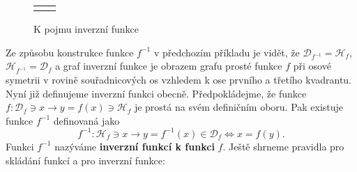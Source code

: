 {       \begin{figure}[ht!]
         \centering  
         \begin{tabular}{cc}
           \subfloat[ ]{\label{mai_fig016a}
             }              &
           \subfloat[ ]{\label{mai_fig016b}
             }              \\
         \end{tabular}
         \caption{K pojmu inverzní funkce}
         \label{mai_fig016}
       \end{figure}
      
        
      
      Ze způsobu konstrukce funkce \(f^{-1}\) v předchozím příkladu je vidět, že 
      \(\mathcal{D}_{f^{-1}} = \mathcal{H}_f\), \(\mathcal{H}_{f^{-1}} = \mathcal{D}_f\) a graf 
      inverzní funkce je obrazem grafu prosté funkce \(f\) při osové symetrii v rovině 
      souřadnicových os vzhledem k ose prvního a třetího kvadrantu. Nyní již definujeme inverzní 
      funkci obecně. Předpokládejme, že funkce \(f : \mathcal{D}_f\ni x \rightarrow y = f(x)\ni 
      \mathcal{H}_f\) je prostá na svém definičním oboru. Pak existuje funkce \(f^{-1}\) definovaná 
      jako
      \begin{equation}\label{mai:eq029}
        f^{-1} :\mathcal{H}_f\ni x\rightarrow y = f^{-1}(x)\in\mathcal{D}_f\Leftrightarrow x = f(y).
      \end{equation}
      Funkci \(f^{-1}\) nazýváme \textbf{inverzní funkcí k funkci} \(f\). Ještě shrneme pravidla 
      pro skládání funkcí a pro inverzní funkce:

}
